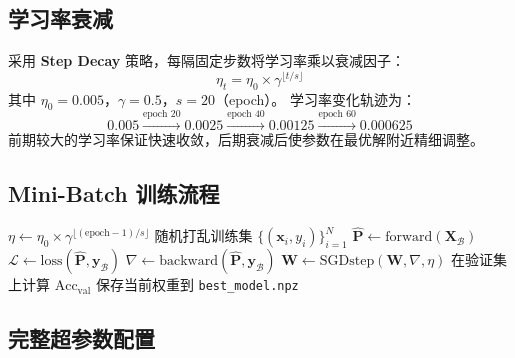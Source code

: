 \documentclass[12pt, a4paper]{article}
\begin{document}
\subsection{学习率衰减}

采用 \textbf{Step Decay} 策略，每隔固定步数将学习率乘以衰减因子：
\begin{equation}
  \eta_t = \eta_0 \times \gamma^{\lfloor t / s \rfloor}
  \label{eq:lr_decay}
\end{equation}
其中 $\eta_0 = 0.005$，$\gamma = 0.5$，$s = 20$（epoch）。
学习率变化轨迹为：
\[
  0.005 \xrightarrow{\text{epoch 20}} 0.0025 \xrightarrow{\text{epoch 40}} 0.00125 \xrightarrow{\text{epoch 60}} 0.000625
\]
前期较大的学习率保证快速收敛，后期衰减后使参数在最优解附近精细调整。

\subsection{Mini-Batch 训练流程}

\begin{algorithm}[H]
  \caption{Mini-Batch SGD 训练循环}
  \label{alg:train}
  \begin{algorithmic}[1]
      \State $\eta \leftarrow \eta_0 \times \gamma^{\lfloor (\text{epoch}-1) / s \rfloor}$
      \State 随机打乱训练集 $\{(\mathbf{x}_i, y_i)\}_{i=1}^N$
        \State $\hat{\mathbf{P}} \leftarrow \mathrm{forward}(\mathbf{X}_\mathcal{B})$
        \State $\mathcal{L} \leftarrow \mathrm{loss}(\hat{\mathbf{P}}, \mathbf{y}_\mathcal{B})$
        \State $\nabla \leftarrow \mathrm{backward}(\hat{\mathbf{P}}, \mathbf{y}_\mathcal{B})$
        \State $\mathbf{W} \leftarrow \mathrm{SGDstep}(\mathbf{W}, \nabla, \eta)$
      \EndFor
      \State 在验证集上计算 $\mathrm{Acc}_\mathrm{val}$
        \State 保存当前权重到 \texttt{best\_model.npz}
      \EndIf
    \EndFor
  \end{algorithmic}
\end{algorithm}

\subsection{完整超参数配置}
\end{document}
